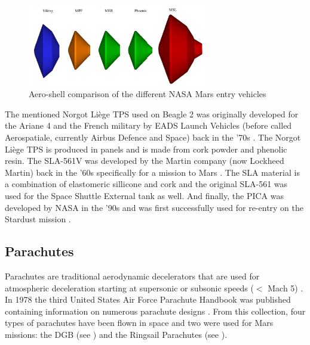 \begin{figure}[!ht]
\centering
\includegraphics[width=0.7\textwidth]{figures/entry_descent/aeroshellcomp_way2007.jpg}
\caption{Aero-shell comparison of the different NASA Mars entry vehicles \cite{way2007}}
\label{fig:aeroshellcomp_way2007}
\end{figure}

The mentioned Norgot Liège \acs{TPS} used on Beagle 2 was originally developed for the Ariane 4 \cite{bouilly2006} and the French military by EADS Launch Vehicles (before called Aerospatiale, currently Airbus Defence and Space) back in the '70s \cite{plotard2003}. The Norgot Liège \acs{TPS} is produced in panels and is made from cork powder and phenolic resin. The \acs{SLA}-561V was developed by the Martin company (now Lockheed Martin) back in the '60s specifically for a mission to Mars \cite{strauss1967}. The \acf{SLA} material is a combination of elastomeric sillicone and cork \cite{martin1975} and the original \acs{SLA}-561 was used for the Space Shuttle External tank as well. And finally, the \acf{PICA} was developed by NASA in the '90s and was first successfully used for re-entry on the Stardust mission \cite{blau2011}.






\subsection{Parachutes}
\label{subsec:para}
Parachutes are traditional aerodynamic decelerators that are used for atmospheric deceleration starting at supersonic or subsonic speeds ($<$ Mach 5) \cite{mooij2013para}. In 1978 the third United States Air Force Parachute Handbook was published containing information on numerous parachute designs \cite{ewing1978}. From this collection, four types of parachutes have been flown in space \cite{mooij2013para} and two were used for Mars missions: the \ac{DGB} (see ) and the Ringsail Parachutes (see ).  

